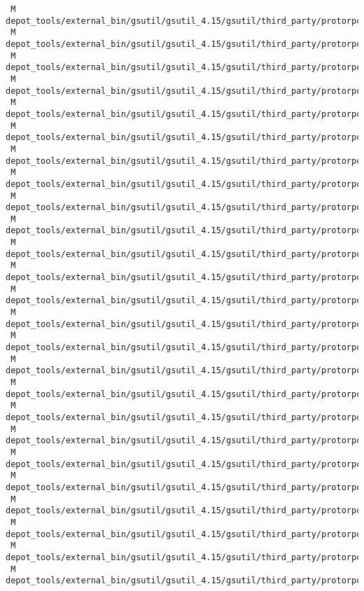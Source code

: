 \documentclass{article}
\begin{document}
\begin{verbatim}
 M depot_tools/external_bin/gsutil/gsutil_4.15/gsutil/third_party/protorpc/demos/quotas/backend/quotas/services.py
 M depot_tools/external_bin/gsutil/gsutil_4.15/gsutil/third_party/protorpc/demos/quotas/backend/quotas/services_test.py
 M depot_tools/external_bin/gsutil/gsutil_4.15/gsutil/third_party/protorpc/demos/tunes_db/client/fetch_descriptor.py
 M depot_tools/external_bin/gsutil/gsutil_4.15/gsutil/third_party/protorpc/demos/tunes_db/client/main.py
 M depot_tools/external_bin/gsutil/gsutil_4.15/gsutil/third_party/protorpc/demos/tunes_db/server/model.py
 M depot_tools/external_bin/gsutil/gsutil_4.15/gsutil/third_party/protorpc/demos/tunes_db/server/model_test.py
 M depot_tools/external_bin/gsutil/gsutil_4.15/gsutil/third_party/protorpc/demos/tunes_db/server/tunes_db.py
 M depot_tools/external_bin/gsutil/gsutil_4.15/gsutil/third_party/protorpc/demos/tunes_db/server/tunes_db_test.py
 M depot_tools/external_bin/gsutil/gsutil_4.15/gsutil/third_party/protorpc/ez_setup.py
 M depot_tools/external_bin/gsutil/gsutil_4.15/gsutil/third_party/protorpc/gen_protorpc.py
 M depot_tools/external_bin/gsutil/gsutil_4.15/gsutil/third_party/protorpc/protorpc/definition_test.py
 M depot_tools/external_bin/gsutil/gsutil_4.15/gsutil/third_party/protorpc/protorpc/descriptor.py
 M depot_tools/external_bin/gsutil/gsutil_4.15/gsutil/third_party/protorpc/protorpc/descriptor_test.py
 M depot_tools/external_bin/gsutil/gsutil_4.15/gsutil/third_party/protorpc/protorpc/end2end_test.py
 M depot_tools/external_bin/gsutil/gsutil_4.15/gsutil/third_party/protorpc/protorpc/generate_proto.py
 M depot_tools/external_bin/gsutil/gsutil_4.15/gsutil/third_party/protorpc/protorpc/generate_proto_test.py
 M depot_tools/external_bin/gsutil/gsutil_4.15/gsutil/third_party/protorpc/protorpc/generate_python.py
 M depot_tools/external_bin/gsutil/gsutil_4.15/gsutil/third_party/protorpc/protorpc/generate_python_test.py
 M depot_tools/external_bin/gsutil/gsutil_4.15/gsutil/third_party/protorpc/protorpc/generate_test.py
 M depot_tools/external_bin/gsutil/gsutil_4.15/gsutil/third_party/protorpc/protorpc/messages.py
 M depot_tools/external_bin/gsutil/gsutil_4.15/gsutil/third_party/protorpc/protorpc/messages_test.py
 M depot_tools/external_bin/gsutil/gsutil_4.15/gsutil/third_party/protorpc/protorpc/protobuf_test.py
 M depot_tools/external_bin/gsutil/gsutil_4.15/gsutil/third_party/protorpc/protorpc/protojson_test.py
 M depot_tools/external_bin/gsutil/gsutil_4.15/gsutil/third_party/protorpc/protorpc/protourlencode.py
 M depot_tools/external_bin/gsutil/gsutil_4.15/gsutil/third_party/protorpc/protorpc/protourlencode_test.py

\end{verbatim}
\end{document}
